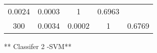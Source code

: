 \documentclass{ctexart}
\begin{document}
\begin{longtable}[]{@{}ccccc@{}}
\begin{minipage}[t]{0.21\columnwidth}
0.0024\strut
\end{minipage} & \begin{minipage}[t]{0.20\columnwidth}\centering\strut
0.0003\strut
\end{minipage} & \begin{minipage}[t]{0.15\columnwidth}\centering\strut
1\strut
\end{minipage} & \begin{minipage}[t]{0.14\columnwidth}\centering\strut
0.6963\strut
\end{minipage}\tabularnewline
\begin{minipage}[t]{0.16\columnwidth}\centering\strut
300\strut
\end{minipage} & \begin{minipage}[t]{0.21\columnwidth}\centering\strut
0.0034\strut
\end{minipage} & \begin{minipage}[t]{0.20\columnwidth}\centering\strut
0.0002\strut
\end{minipage} & \begin{minipage}[t]{0.15\columnwidth}\centering\strut
1\strut
\end{minipage} & \begin{minipage}[t]{0.14\columnwidth}\centering\strut
0.6769\strut
\end{minipage}\tabularnewline
\bottomrule
\end{longtable}

** Classifer 2 -SVM**
\end{document}

